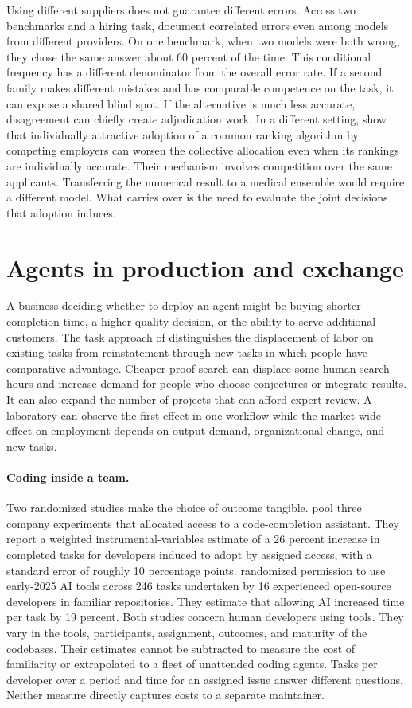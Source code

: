 \documentclass[11pt,letterpaper]{article}
\begin{document}
Using different suppliers does not guarantee different errors. Across two benchmarks and a hiring task, \citet{kim} document correlated errors even among models from different providers. On one benchmark, when two models were both wrong, they chose the same answer about 60 percent of the time. This conditional frequency has a different denominator from the overall error rate. If a second family makes different mistakes and has comparable competence on the task, it can expose a shared blind spot. If the alternative is much less accurate, disagreement can chiefly create adjudication work. In a different setting, \citet{kleinberg} show that individually attractive adoption of a common ranking algorithm by competing employers can worsen the collective allocation even when its rankings are individually accurate. Their mechanism involves competition over the same applicants. Transferring the numerical result to a medical ensemble would require a different model. What carries over is the need to evaluate the joint decisions that adoption induces.

\section{Agents in production and exchange}

A business deciding whether to deploy an agent might be buying shorter completion time, a higher-quality decision, or the ability to serve additional customers. The task approach of \citet{acemoglu} distinguishes the displacement of labor on existing tasks from reinstatement through new tasks in which people have comparative advantage. Cheaper proof search can displace some human search hours and increase demand for people who choose conjectures or integrate results. It can also expand the number of projects that can afford expert review. A laboratory can observe the first effect in one workflow while the market-wide effect on employment depends on output demand, organizational change, and new tasks.

\paragraph{Coding inside a team.}
Two randomized studies make the choice of outcome tangible. \citet{cui} pool three company experiments that allocated access to a code-completion assistant. They report a weighted instrumental-variables estimate of a 26 percent increase in completed tasks for developers induced to adopt by assigned access, with a standard error of roughly 10 percentage points. \citet{becker} randomized permission to use early-2025 AI tools across 246 tasks undertaken by 16 experienced open-source developers in familiar repositories. They estimate that allowing AI increased time per task by 19 percent. Both studies concern human developers using tools. They vary in the tools, participants, assignment, outcomes, and maturity of the codebases. Their estimates cannot be subtracted to measure the cost of familiarity or extrapolated to a fleet of unattended coding agents. Tasks per developer over a period and time for an assigned issue answer different questions. Neither measure directly captures costs to a separate maintainer.
\end{document}
